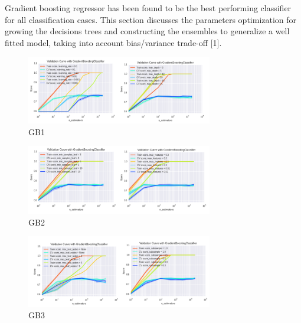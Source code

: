 Gradient boosting regressor has been found to be the best performing classifier for all classification cases. This section discusses the parameters optimization for growing the decisions trees and constructing the ensembles to generalize a well fitted model, taking into account bias/variance trade-off [1].

\begin{figure}[h]
\centering
\includegraphics[width=3.2in]{figures/gb1}
\caption{GB1}
\label{fig:gb1}
\end{figure}
\begin{figure}[h]
\centering
\includegraphics[width=3.2in]{figures/gb2}
\caption{GB2}
\label{fig:gb2}
\end{figure}
\begin{figure}[h]
\centering
\includegraphics[width=3.2in]{figures/gb3}
\caption{GB3}
\label{fig:gb3}
\end{figure}

